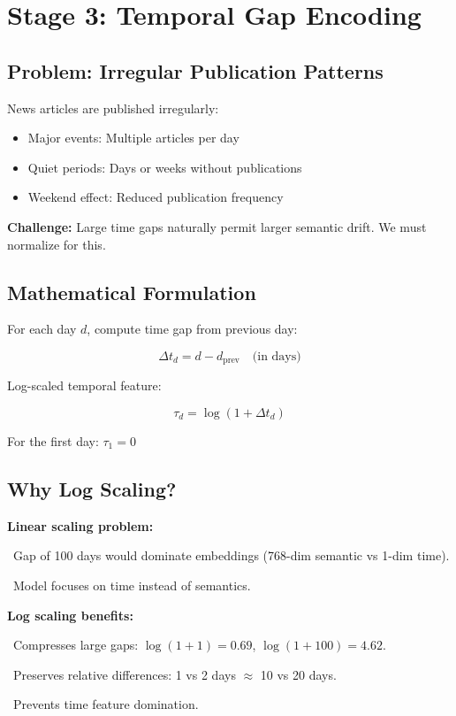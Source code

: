 \documentclass[12pt]{article}
\begin{document}
\newpage

\section{Stage 3: Temporal Gap Encoding}

\subsection{Problem: Irregular Publication Patterns}

News articles are published irregularly:
\begin{itemize}
    \item Major events: Multiple articles per day
    \item Quiet periods: Days or weeks without publications
    \item Weekend effect: Reduced publication frequency
\end{itemize}

\textbf{Challenge:} Large time gaps naturally permit larger semantic drift. We must normalize for this.

\subsection{Mathematical Formulation}

For each day $d$, compute time gap from previous day:

\begin{equation}
\Delta t_d = d - d_{\text{prev}} \quad \text{(in days)}
\end{equation}

Log-scaled temporal feature:

\begin{equation}
\tau_d = \log(1 + \Delta t_d)
\end{equation}

For the first day: $\tau_1 = 0$

\subsection{Why Log Scaling?}

\begin{tcolorbox}[colback=yellow!5!white, colframe=orange!75!black, title=Log Scaling Rationale]
\textbf{Linear scaling problem:}

\textbullet\ Gap of 100 days would dominate embeddings (768-dim semantic vs 1-dim time).

\textbullet\ Model focuses on time instead of semantics.

\textbf{Log scaling benefits:}

\textbullet\ Compresses large gaps: $\log(1+1) = 0.69$, $\log(1+100) = 4.62$.

\textbullet\ Preserves relative differences: 1 vs 2 days $\approx$ 10 vs 20 days.

\textbullet\ Prevents time feature domination.
\end{tcolorbox}
\end{document}
